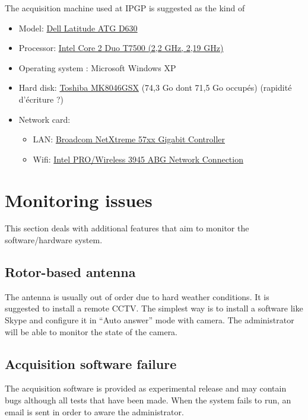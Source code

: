 \documentclass[a4paper]{report}
\begin{document}
The acquisition machine used at IPGP is suggested as the kind of 
\begin{itemize}
  \item{Model: \href{http://support.dell.com/support/edocs/systems/latd630a/en/sm/index.htm}{Dell Latitude ATG D630}}
  \item{Processor: \href{http://ark.intel.com/products/29761/Intel-Core2-Duo-Processor-T7500-\%284M-Cache-2_20-GHz-800-MHz-FSB\%29}{Intel Core 2 Duo T7500 (2,2 GHz, 2,19 GHz)}}
  \item{Operating system : Microsoft Windows XP}
  \item{Hard disk: \href{http://storage.toshiba.com/storagesolutions/archived-models/mk8046gsx}{Toshiba MK8046GSX} (74,3 Go dont 71,5 Go occup\'es) (rapidit\'e d'\'ecriture ?)}
  \item{Network card:
    \begin{itemize}
      \item{LAN: \href{http://www.broadcom.com/support/ethernet_nic/netlink_k57.php}{Broadcom NetXtreme 57xx Gigabit Controller}}
      \item{Wifi: \href{http://www.intel.com/products/wireless/prowireless_mobile.htm}{Intel PRO/Wireless 3945 ABG Network Connection}}
    \end{itemize}
  }
\end{itemize}

\section{Monitoring issues}

This section deals with additional features that aim to monitor the software/hardware system.

\subsection{Rotor-based antenna}

The antenna is usually out of order due to hard weather conditions. It is suggested to install a remote CCTV. The simplest way is to install a software like Skype and configure it in ``Auto answer'' mode with camera. The administrator will be able to monitor the state of the camera.

\subsection{Acquisition software failure}

The acquisition software is provided as experimental release and may contain bugs although all tests that have been made. When the system fails to run, an email is sent in order to aware the administrator.
\end{document}
